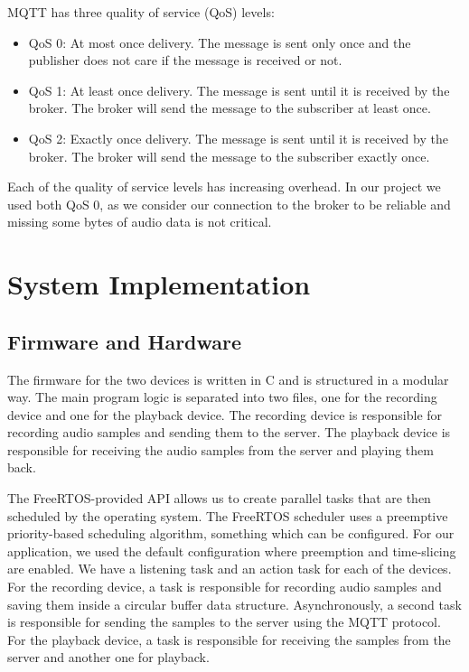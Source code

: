 \documentclass[conference]{IEEEtran}
\begin{document}
MQTT has three quality of service (QoS) levels:

\begin{itemize}
    \item QoS 0: At most once delivery. The message is sent only once and the publisher does not care if the message is received or not.
    \item QoS 1: At least once delivery. The message is sent until it is received by the broker. The broker will send the message to the subscriber at least once.
    \item QoS 2: Exactly once delivery. The message is sent until it is received by the broker. The broker will send the message to the subscriber exactly once.
\end{itemize}

Each of the quality of service levels has increasing overhead. In our project
we used both QoS 0, as we consider our connection to the broker to be reliable 
and missing some bytes of audio data is not critical.

\section{System Implementation}
\label{sec:system_implementation}

\subsection{Firmware and Hardware}

The firmware for the two devices is written in C and is structured in a modular way.
The main program logic is separated into two files, one for the recording device and one for the playback device.
The recording device is responsible for recording audio samples and sending them to the server.
The playback device is responsible for receiving the audio samples from the server and playing them back.

The FreeRTOS-provided API allows us to create parallel tasks that are then scheduled by the operating system.
The FreeRTOS scheduler uses a preemptive priority-based scheduling algorithm\cite{FreeRTOS_Scheduling}, something which can be configured.
For our application, we used the default configuration where preemption and time-slicing are enabled.
We have a listening task and an action task for each of the devices.
For the recording device, a task is responsible for recording audio samples and saving them 
inside a circular buffer data structure. Asynchronously, a second task is responsible for
sending the samples to the server using the MQTT protocol.
For the playback device, a task is responsible for receiving the samples from the server
and another one for playback.
\end{document}
